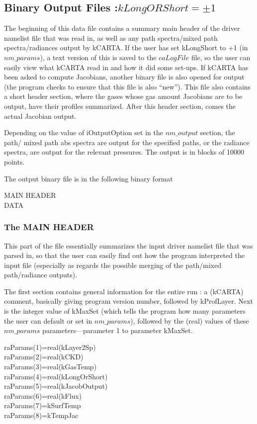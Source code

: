 \documentclass[12pt]{article}
\newcommand{\kc}{\textsf{kCARTA}\xspace}
\newcommand{\ttab}{\indent\indent}
\begin{document}
{{{\subsection{Binary Output Files :$kLongORShort = \pm 1$}

The beginning of this data file contains a 
summary main header of the driver namelist file that
was read in, as well as any path spectra/mixed path spectra/radiances
output by \kc.  If the user has set kLongShort to +1 (in $nm\_params$), a
text version of this is saved to the $caLogFile$ file, so the user
can easily view what \kc read in and how it did some set-ups. If \kc
has been asked to compute Jacobians, another binary file is also
opened for output (the program checks to ensure that this file is
also ``new''). This file also contains a short header section,
where the gases whose gas amount Jacobians are to be output, have
their profiles summarized.  After this header section, comes the actual
Jacobian output.

Depending on the value of iOutputOption set in the $nm\_output$ section,
the path/ mixed path abs spectra are output for the specified paths, or
the radiance spectra, are output for the relevant pressures.  The
output is in blocks of 10000 points.

The output binary file is in the following binary format

\smallskip
\ttab MAIN HEADER\\
\ttab DATA

\subsubsection{The MAIN HEADER}

This part of the file essentially summarizes the input driver namelist file
that was parsed in, so that the user can easily find out how the
program interpreted the input file (especially as regards the possible
merging of the path/mixed path/radiance outputs).

The first section contains general information for the entire run :
a (\kc) comment, basically giving program version number, followed
by kProfLayer.  Next is the integer value of kMaxSet (which
tells the program how many parameters the user can default or set in
$nm\_params$), followed by the (real) values of these $nm\_params$
parameters---parameter 1 to parameter kMaxSet.

\medskip
{\sf 
\ttab      raParams(1)=real(kLayer2Sp)\\
\ttab      raParams(2)=real(kCKD)\\
\ttab      raParams(3)=real(kGasTemp)\\
\ttab      raParams(4)=real(kLongOrShort)\\
\ttab      raParams(5)=real(kJacobOutput)\\
\ttab      raParams(6)=real(kFlux)\\
\ttab      raParams(7)=kSurfTemp\\
\ttab      raParams(8)=kTempJac\\

}}}}
\end{document}
